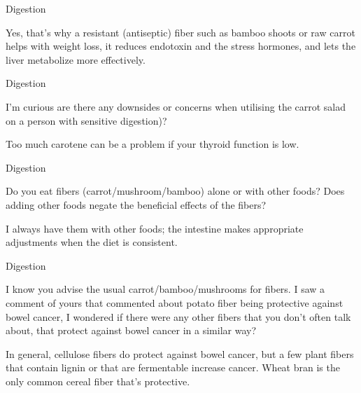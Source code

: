 \documentclass[11pt,oneside,openany,extrafontsizes]{memoir}
\begin{document}
\begin{standalonequote}{Digestion}

    \begin{answer}
        Yes, that's why a resistant (antiseptic) fiber such as bamboo shoots or raw carrot helps with weight loss, it reduces endotoxin and the stress hormones, and lets the liver metabolize more effectively.
    \end{answer}
\end{standalonequote}

\begin{qaexchange}{Digestion}

    \begin{question}
        I'm curious are there any downsides or concerns when utilising the carrot salad on a person with sensitive digestion)?
    \end{question}

    \begin{answer}
      Too much carotene can be a problem if your thyroid function is low.
    \end{answer}
\end{qaexchange}

\begin{qaexchange}{Digestion}

    \begin{question}
        Do you eat fibers (carrot/mushroom/bamboo) alone or with other foods? Does adding other foods negate the beneficial effects of the fibers?
    \end{question}

    \begin{answer}
       I always have them with other foods; the intestine makes appropriate adjustments when the diet is consistent. 
    \end{answer}
\end{qaexchange}

\begin{qaexchange}{Digestion}

    \begin{question}
        I know you advise the usual carrot/bamboo/mushrooms for fibers. I saw a comment of yours that commented about potato fiber being protective against bowel cancer, I wondered if there were any other fibers that you don't often talk about, that protect against bowel cancer in a similar way?
    \end{question}

    \begin{answer}
      In general, cellulose fibers do protect against bowel cancer, but a few plant fibers that contain lignin or that are fermentable increase cancer. Wheat bran is the only common cereal fiber that's protective.
    \end{answer}
\end{qaexchange}
\end{document}
